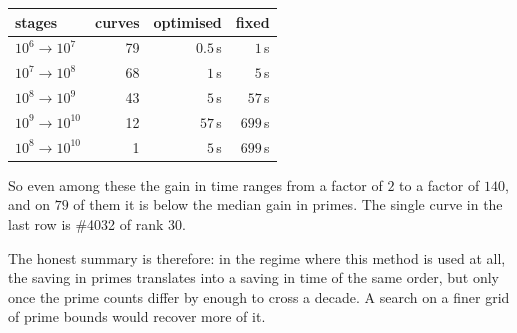 \documentclass[11pt]{amsart}
\theoremstyle{remark}
\theoremstyle{definition}
\begin{document}
\begin{center}\small
\begin{tabular}{lrrr}
\toprule
stages & curves & optimised & fixed\\
\midrule
$10^6\to10^7$ & 79 & $0.5$\,s & $1$\,s\\
$10^7\to10^8$ & 68 & $1$\,s & $5$\,s\\
$10^8\to10^9$ & 43 & $5$\,s & $57$\,s\\
$10^9\to10^{10}$ & 12 & $57$\,s & $699$\,s\\
$10^8\to10^{10}$ & 1 & $5$\,s & $699$\,s\\
\bottomrule
\end{tabular}
\end{center}

\noindent
So even among these the gain in time ranges from a factor of $2$ to a factor of $140$, and on $79$ of
them it is below the median gain in primes. The single curve in the last row is \#4032 of rank $30$.

The honest summary is therefore: in the regime where this method is used at all, the saving in
primes translates into a saving in time of the same order, but only once the prime counts differ
by enough to cross a decade. A search on a finer grid of prime bounds would recover more of it.
\end{document}
